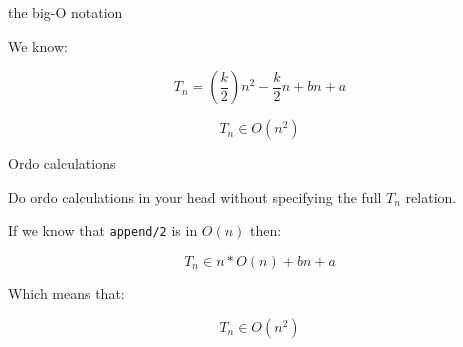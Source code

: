 \begin{frame}[fragile]{the big-O notation}

  We know:

  \vspace{10pt}\pause

  $$T_n  = (\frac{k}{2})n^2 - \frac{k}{2}n+ bn + a $$

  \vspace{20pt}\pause

  $$T_n \in O(n^2)$$
  
\end{frame}

\begin{frame}{Ordo calculations}

  Do ordo calculations in your head without specifying the full $T_n$
  relation. \pause

  \vspace{10pt}If we know that {\tt append/2} is in $O(n)$ then: \pause
  
  $$ T_n \in n * O(n) + bn + a$$ 

  \vspace{10pt}Which means that:

  $$ T_n \in O(n^2)$$

\end{frame}



